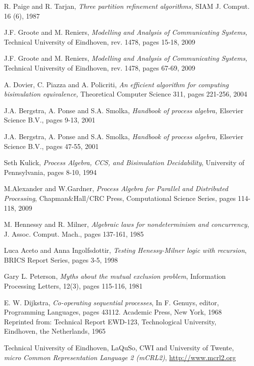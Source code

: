 \begin{thebibliography}{1}
R. Paige and R. Tarjan, \emph{Three partition refinement algorithms}\emph, 
SIAM J. Comput. 16 (6), 1987

J.F. Groote and M. Reniers, 
\emph{Modelling and Analysis of Communicating Systems}\emph, 
Technical University of Eindhoven, rev. 1478, pages 15-18, 2009

J.F. Groote and M. Reniers, 
\emph{Modelling and Analysis of Communicating Systems}\emph, 
Technical University of Eindhoven, rev. 1478, pages 67-69, 2009

A. Dovier, C. Piazza and A. Policriti, 
\emph{An efficient algorithm for computing bisimulation equivalence}\emph, 
Theoretical Computer Science 311, pages 221-256, 2004

J.A. Bergstra, A. Ponse and S.A. Smolka, 
\emph{Handbook of process algebra}\emph, 
Elsevier Science B.V., pages 9-13, 2001

J.A. Bergstra, A. Ponse and S.A. Smolka, 
\emph{Handbook of process algebra}\emph, 
Elsevier Science B.V., pages 47-55, 2001

Seth Kulick,
\emph{Process Algebra, CCS, and Bisimulation Decidability},
University of Pennsylvania, pages 8-10, 1994

M.Alexander and W.Gardner,
\emph{Process Algebra for Parallel and Distributed Processing},
Chapman\&Hall/CRC Press, Computational Science Series, pages 114-118, 2009

M. Hennessy and R. Milner,
\emph{Algebraic laws for nondeterminism and concurrency},
J. Assoc. Comput. Mach., pages 137-161, 1985

Luca Aceto and Anna Ingolfsdottir,
\emph{Testing Henessy-Milner logic with recursion},
BRICS Report Series, pages 3-5, 1998

Gary L. Peterson,
\emph{Myths about the mutual exclusion problem}, 
Information Processing Letters, 12(3), pages 115-116, 1981

E. W. Dijkstra,
\emph{Co-operating sequential processes}, 
In F. Genuys, editor, Programming Languages, pages 43112. Academic Press, New York, 1968
Reprinted from: Technical Report EWD-123, Technological University, Eindhoven, the Netherlands, 1965

Technical University of Eindhoven, LaQuSo, CWI and University of Twente,
\emph{micro Common Representation Language 2 (mCRL2)},	
\newline \url{http://www.mcrl2.org}

\end{thebibliography}
